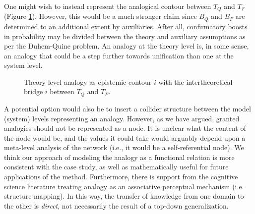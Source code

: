 \documentclass[11pt, oneside]{article}   	%
\begin{document}
One might wish to instead represent the analogical contour between $T_Q$ and $T_F$ (Figure \ref{fig:SystemLadder(STRONG)}).  However, this would be a much stronger claim since $B_Q$ and $B_F$ are determined to an additional extent by auxiliaries.  After all, confirmatory boosts in probability may be divided between the theory and auxiliary assumptions as per the Duhem-Quine problem.  An analogy at the theory level is, in some sense, an analogy that could be a step further towards unification than one at the system level.  


%
\begin{figure} [ht!]
\begin{center}
\caption{Theory-level analogy as epistemic contour $i$ with the intertheoretical bridge $i$ between $T_Q$ and $T_F$.}
\label{fig:SystemLadder(STRONG)}
\end{center}
\end{figure}





















A potential option would also be to insert a collider structure between the model (system) levels representing an analogy.  However, as we have argued, granted analogies should not be represented as a node.  It is unclear what the content of the node would be, and the values it could take would arguably  depend upon a meta-level analysis of the network (i.e., it would be a self-referential node).  We think our approach of modeling the analogy as a functional relation is more consistent with the case study, as well as mathematically useful for future applications of the method.  Furthermore, there is support from the cognitive science literature treating analogy as an associative perceptual mechanism (i.e. structure mapping).  In this way, the transfer of knowledge from one domain to the other is \emph{direct}, not necessarily the result of a top-down generalization.  
\end{document}
